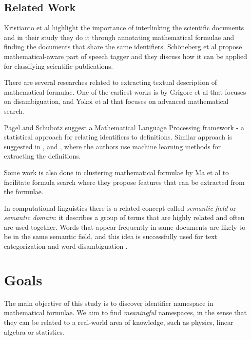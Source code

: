 \subsection{Related Work}

Kristianto et al \cite{kristianto2014extracting} highlight the importance of interlinking the scientific documents and in their study they do it through annotating mathematical formulae and finding the documents that share the same identifiers. Sch\"oneberg et al \cite{schoneberg2014pos} propose mathematical-aware part of speech tagger and they discuss how it can be applied for classifying scientific publications.

There are several researches related to extracting textual description of mathematical formulae. One of the earliest works is by Grigore et al \cite{grigore2009towards} that focuses on disambiguation,
and Yokoi et al \cite{yokoi2011contextual} that focuses on advanced mathematical search.

Pagel and Schubotz \cite{pagael2014mlp} suggest a Mathematical Language Processing framework - a statistical approach for relating identifiers to definitions. Similar approach is suggested in \cite{yokoi2011contextual}, \cite{kristianto2014extracting} and \cite{kristianto2012extracting}, where the authors use machine learning methods for extracting the definitions.

Some work is also done in clustering mathematical formulae by Ma et al \cite{ma2010feature} to facilitate formula search where they propose features that can be extracted from the formulae.

In computational linguistics there is a related concept called \emph{semantic field} or \emph{semantic domain}: it describes a group of terms that are highly related and often are used together. Words that appear frequently in same documents are likely to be in the same semantic field, and this idea is successfully used for text categorization and word disambiguation \cite{gliozzo2009semantic}.



\section{Goals}

The main objective of this study is to discover identifier namespace in mathematical formulae.
We aim to find \emph{meaningful} namespaces, in the sense that they can be related to a real-world area of knowledge, such as physics, linear algebra or statistics.

